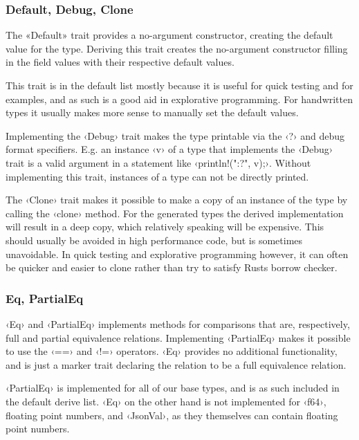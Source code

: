 
\subsubsection{Default, Debug, Clone}

The «Default» trait provides a no-argument constructor, creating the default value for the type. Deriving this trait creates the no-argument constructor filling in the field values with their respective default values.

This trait is in the default list mostly because it is useful for quick testing and for examples, and as such is a good aid in explorative programming. For handwritten types it usually makes more sense to manually set the default values.

Implementing the ‹Debug› trait makes the type printable via the ‹?› and  debug format specifiers. E.g. an instance ‹v› of a type that implements the ‹Debug› trait is a valid argument in a statement like ‹println!("{:?}", v);›. Without implementing this trait, instances of a type can not be directly printed.

The ‹Clone› trait makes it possible to make a copy of an instance of the type by calling the ‹clone› method. For the generated types the derived implementation will result in a deep copy, which relatively speaking will be expensive. This should usually be avoided in high performance code, but is sometimes unavoidable. In quick testing and explorative programming however, it can often be quicker and easier to clone rather than try to satisfy Rusts borrow checker.

\subsubsection{Eq, PartialEq}

‹Eq› and ‹PartialEq› implements methods for comparisons that are, respectively, full and partial equivalence relations. Implementing ‹PartialEq› makes it possible to use the ‹==› and ‹!=› operators. ‹Eq› provides no additional functionality, and is just a marker trait declaring the relation to be a full equivalence relation.

‹PartialEq› is implemented for all of our base types, and is as such included in the default derive list. ‹Eq› on the other hand is not implemented for ‹f64›, floating point numbers, and ‹JsonVal›, as they themselves can contain floating point numbers.

